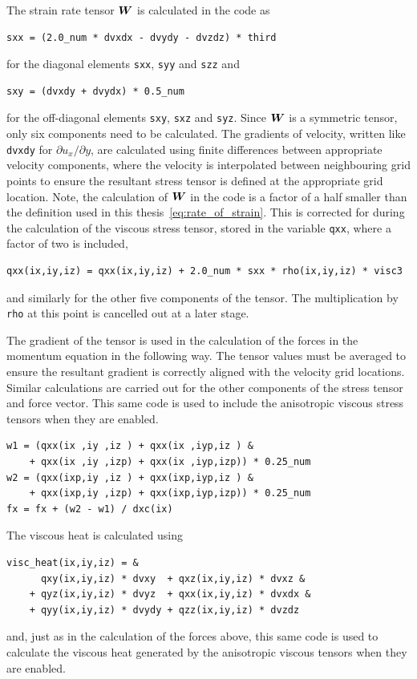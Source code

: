 The strain rate tensor ${\bm W}$ is calculated in the code as
\begin{lstlisting}
sxx = (2.0_num * dvxdx - dvydy - dvzdz) * third
\end{lstlisting}
for the diagonal elements \verb|sxx|, \verb|syy| and \verb|szz| and
\begin{lstlisting}
sxy = (dvxdy + dvydx) * 0.5_num
\end{lstlisting}
for the off-diagonal elements \verb|sxy|, \verb|sxz| and \verb|syz|. Since ${\bm W}$ is a symmetric tensor, only six components need to be calculated. The gradients of velocity, written like \verb|dvxdy| for $\partial u_x / \partial y$, are calculated using finite differences between appropriate velocity components, where the velocity is interpolated between neighbouring grid points to ensure the resultant stress tensor is defined at the appropriate grid location. Note, the calculation of ${\bm W}$ in the code is a factor of a half smaller than the definition used in this thesis~\eqref{eq:rate_of_strain}. This is corrected for during the calculation of the viscous stress tensor, stored in the variable \verb|qxx|, where a factor of two is included,
\begin{lstlisting}
qxx(ix,iy,iz) = qxx(ix,iy,iz) + 2.0_num * sxx * rho(ix,iy,iz) * visc3
\end{lstlisting}
and similarly for the other five components of the tensor. The multiplication by \verb|rho| at this point is cancelled out at a later stage.

The gradient of the tensor is used in the calculation of the forces in the momentum equation in the following way. The tensor values must be averaged to ensure the resultant gradient is correctly aligned with the velocity grid locations. Similar calculations are carried out for the other components of the stress tensor and force vector. This same code is used to include the anisotropic viscous stress tensors when they are enabled.
\begin{lstlisting}
w1 = (qxx(ix ,iy ,iz ) + qxx(ix ,iyp,iz ) &
    + qxx(ix ,iy ,izp) + qxx(ix ,iyp,izp)) * 0.25_num
w2 = (qxx(ixp,iy ,iz ) + qxx(ixp,iyp,iz ) &
    + qxx(ixp,iy ,izp) + qxx(ixp,iyp,izp)) * 0.25_num
fx = fx + (w2 - w1) / dxc(ix)
\end{lstlisting}

The viscous heat is calculated using
\begin{lstlisting}
visc_heat(ix,iy,iz) = &
      qxy(ix,iy,iz) * dvxy  + qxz(ix,iy,iz) * dvxz &
    + qyz(ix,iy,iz) * dvyz  + qxx(ix,iy,iz) * dvxdx &
    + qyy(ix,iy,iz) * dvydy + qzz(ix,iy,iz) * dvzdz
\end{lstlisting}
and, just as in the calculation of the forces above, this same code is used to calculate the viscous heat generated by the anisotropic viscous tensors when they are enabled.

